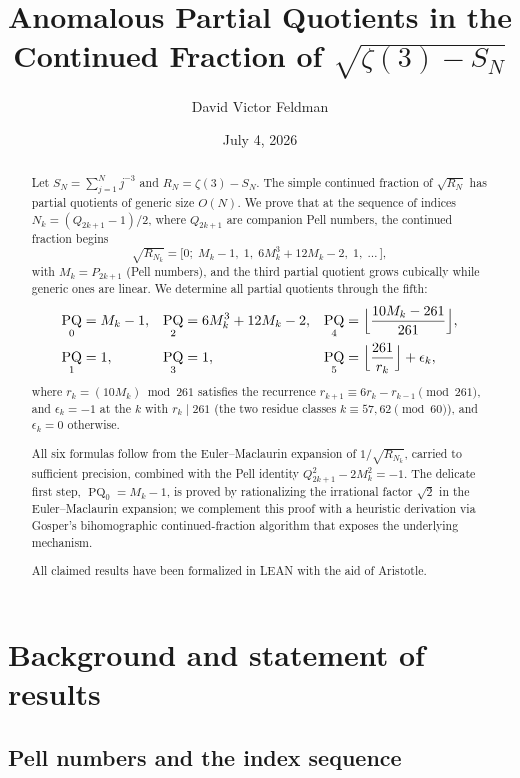 \documentclass[12pt]{amsart}
\title{Anomalous Partial Quotients in the Continued Fraction
       of $\sqrt{\zeta(3)-S_N}$}
\author{David Victor Feldman}
\date{July 4, 2026}
\theoremstyle{definition}
\DeclareMathOperator{\PQ}{PQ}
\begin{document}
\begin{abstract}
Let $S_N = \sum_{j=1}^N j^{-3}$ and $R_N = \zeta(3) - S_N$.
The simple continued fraction of $\sqrt{R_N}$ has partial quotients
of generic size $O(N)$.  We prove that at the sequence of indices
$N_k = (Q_{2k+1}-1)/2$, where $Q_{2k+1}$ are companion Pell numbers,
the continued fraction begins
\[
  \sqrt{R_{N_k}}
  = \bigl[0;\; M_k-1,\; 1,\; 6M_k^3+12M_k-2,\; 1,\; \ldots\,\bigr],
\]
with $M_k = P_{2k+1}$ (Pell numbers), and the third partial quotient
grows cubically while generic ones are linear.  We determine all partial
quotients through the fifth:
\begin{align*}
  \PQ_0 &= M_k - 1, &
  \PQ_2 &= 6M_k^3 + 12M_k - 2, &
  \PQ_4 &= \Bigl\lfloor\frac{10M_k - 261}{261}\Bigr\rfloor,\\
  \PQ_1 &= 1, &
  \PQ_3 &= 1, &
  \PQ_5 &= \Bigl\lfloor\frac{261}{r_k}\Bigr\rfloor + \epsilon_k,
\end{align*}
where $r_k = (10M_k) \bmod 261$ satisfies the recurrence
$r_{k+1} \equiv 6r_k - r_{k-1} \pmod{261}$, and $\epsilon_k = -1$ at
the $k$ with $r_k \mid 261$ (the two residue classes $k \equiv 57,
62 \pmod{60}$), and $\epsilon_k = 0$ otherwise.

All six formulas follow from the Euler--Maclaurin expansion of
$1/\sqrt{R_{N_k}}$, carried to sufficient precision, combined with the
Pell identity $Q_{2k+1}^2 - 2M_k^2 = -1$.  The delicate first step,
$\PQ_0 = M_k - 1$, is proved by rationalizing the irrational factor
$\sqrt{2}$ in the Euler--Maclaurin expansion; we complement this proof
with a heuristic derivation via Gosper's bihomographic
continued-fraction algorithm that exposes the underlying mechanism.

All claimed results have been formalized in LEAN with the aid of Aristotle.
\end{abstract}

\maketitle
\tableofcontents

\section{Background and statement of results}
\label{sec:intro}

\subsection{Pell numbers and the index sequence}
\end{document}
